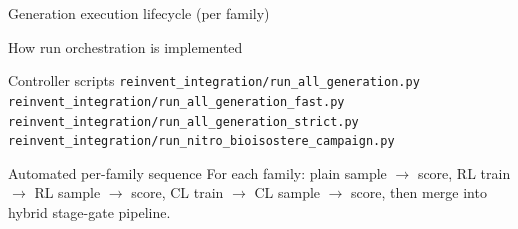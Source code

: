 \documentclass[aspectratio=169,10pt]{beamer}
\begin{document}
\begin{frame}{Generation execution lifecycle (per family)}
  \begin{center}
  \end{center}
\end{frame}

\begin{frame}{How run orchestration is implemented}
  \small
  \begin{block}{Controller scripts}
    \texttt{reinvent\_integration/run\_all\_generation.py}\\
    \texttt{reinvent\_integration/run\_all\_generation\_fast.py}\\
    \texttt{reinvent\_integration/run\_all\_generation\_strict.py}\\
    \texttt{reinvent\_integration/run\_nitro\_bioisostere\_campaign.py}
  \end{block}

  \begin{block}{Automated per-family sequence}
    For each family: plain sample \(\rightarrow\) score,
    RL train \(\rightarrow\) RL sample \(\rightarrow\) score,
    CL train \(\rightarrow\) CL sample \(\rightarrow\) score,
    then merge into hybrid stage-gate pipeline.
  \end{block}
\end{frame}
\end{document}
